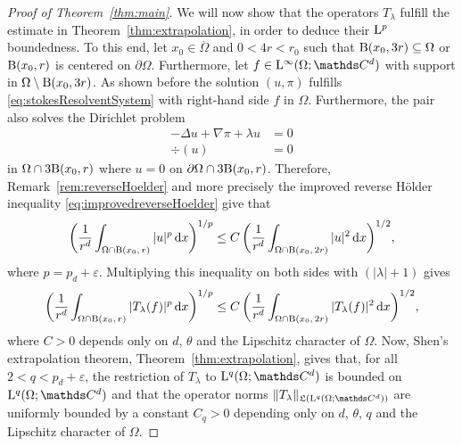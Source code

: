 \begin{proof}[Proof of Theorem~\ref{thm:main}]
  We will now show that the operators $T_\lambda$ fulfill the estimate in Theorem~\ref{thm:extrapolation}, in order to deduce their $\mathrm{L}^p$ boundedness.
  To this end, let $x_0 \in \overline \Omega$ and $0 < 4r < r_0$ such that $\mathrm{B}(x_0,3 r) \subseteq \Omega$ or $\mathrm{B}(x_0, r)$ is centered on $\partial\Omega$.
  Furthermore, let $f \in \Ell^\infty(\Omega; \C^d)$ with support in $\Omega \setminus \mathrm{B}(x_0, 3 r)$.
  As shown before the solution $(u,\pi)$ fulfills \eqref{eq:stokesResolventSystem} with right-hand side $f$ in $\Omega$.
  Furthermore, the pair also solves the Dirichlet problem
  \begin{align*}
    -\Delta u + \nabla \pi + \lambda u &= 0 \\
    \div(u)&= 0
  \end{align*}
  in $\Omega \cap 3 \mathrm{B}(x_0, r)$ where $u = 0$ on $\partial\Omega \cap 3 \mathrm{B}(x_0, r)$.
  Therefore, Remark~\ref{rem:reverseHoelder} and more precisely the improved reverse Hölder inequality \eqref{eq:improvedreverseHoelder} give that
  \begin{align*}
    \bigg( \frac{1}{r^d} \int_{\Omega \cap \mathrm{B}(x_0,\, r)} |u|^p \, {\operatorname{d}\!{x}} \bigg)^{1/p} 
    \leq C\, \bigg( \frac{1}{r^d} \int_{\Omega \cap  \mathrm{B}(x_0,\, 2 r)} |u|^2 \, {\operatorname{d}\!{x}} \bigg)^{1/2},
  \end{align*}
  where $p = p_d + \varepsilon$.
  Multiplying this inequality on both sides with $(|\lambda| + 1)$ gives
  \begin{align}
    \label{eq:tlambdaEstimate}
    \bigg( \frac{1}{r^d} \int_{\Omega \cap \mathrm{B}(x_0,\, r)} |T_\lambda(f)|^p \, {\operatorname{d}\!{x}} \bigg)^{1/p} 
    \leq C\, \bigg( \frac{1}{r^d} \int_{\Omega \cap \mathrm{B}(x_0,\, 2 r)} |T_\lambda(f)|^2 \, {\operatorname{d}\!{x}} \bigg)^{1/2},
  \end{align}
  where $C > 0$ depends only on $d$, $\theta$ and the Lipschitz character of $\Omega$.
  Now, Shen's extrapolation theorem, Theorem~\ref{thm:extrapolation}, gives that, for all $2 < q < p_d + \varepsilon$, the restriction of $T_\lambda$ to $\Ell^q(\Omega; \C^d)$ is bounded on $\Ell^q(\Omega; \C^d)$ and that the operator norms $\|T_\lambda\|_{\Li(\Ell^q(\Omega; \C^d))}$ are uniformly bounded by a constant $C_q > 0$ depending only on $d$, $\theta$, $q$ and the Lipschitz character of $\Omega$.


\end{proof}

